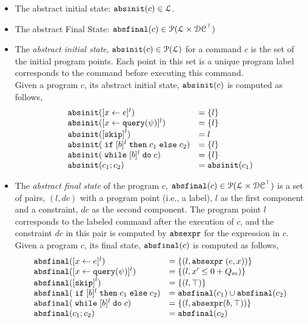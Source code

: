 %
\begin{itemize}
\item The abstract initial state: $\mathtt{abs}{\mathtt{init}}(c) \in \mathcal{L}$.
%
\item The abstract Final State: $\mathtt{abs}{\mathtt{final}}(c) \in \mathcal{P}(\mathcal{L} \times \mathcal{DC}^{\top})$
\end{itemize}

\begin{itemize}
  \item The \emph{abstract initial state}, $\mathtt{abs}{\mathtt{init}}(c) \in \mathcal{P}(\mathcal{L})$
  for a command $c$ is the set of the initial program points.
Each point in this set is a unique program label corresponds to the command before executing this command. 
\\
Given a program $c$, its abstract initial state, $\mathtt{abs}{\mathtt{init}}(c)$ is computed as follows,
%
\[
  \begin{array}{ll}
    \absinit(\clabel{\assign{x}{\expr}}{}^l)  & = \{l\}  \\
    \absinit(\clabel{\assign{x}{\query(\qexpr)}}{}^l)  & = \{l\} \\
    \absinit(\clabel{\eskip}^{l})  & = l \\
    \absinit(\eif [b]^l \ethen c_1 \eelse c_2)  & = \{l\} \\
    \absinit(\ewhile [b]^l \edo c)  & = \{l\} \\
    \absinit(c_1 ; c_2)  & = \absinit(c_1) \\
 \end{array}
 \]
%
%
\item The \emph{abstract final state} of the program $c$, 
$\mathtt{abs}{\mathtt{final}}(c) \in \mathcal{P}(\mathcal{L} \times \mathcal{DC}^{\top})$
is a set of pairs, $(l, dc)$ with a
program point (i.e., a label), $l$ as the first component and a constraint, 
$dc$ as the second component.
The program point $l$ corresponds to the labeled command after the execution of $c$,
and the constraint $dc$ in this pair is computed by $\mathtt{abs}{\mathtt{expr}}$ for the expression in $c$.
\\
Given a program $c$, its final state, $\mathtt{abs}{\mathtt{final}}(c)$ is computed as follows,
 \[
  \begin{array}{ll}
    \absfinal(\clabel{\assign{x}{\expr}}{}^l)  & = \{(l, \absexpr\eapp (\expr, x))\}  \\
     \absfinal(\clabel{\assign{x}{\query(\qexpr)}}{}^l)  & = \{
      (l, x' \leq 0 + Q_m )\}  \\
     \absfinal(\clabel{\eskip}^{l})  
     & = \{(l, \top)\} \\
     \absfinal(\eif [b]^l \ethen c_1 \eelse c_2)  & = \absfinal(c_1) \cup \absfinal(c_2) \\
     \absfinal(\ewhile [b]^l \edo c)  & = \{(l, \absexpr(\bexpr, \top))\} \\
     \absfinal(c_1 ; c_2)  & =  \absfinal(c_2) \\
 \end{array}
 \]
\end{itemize}
